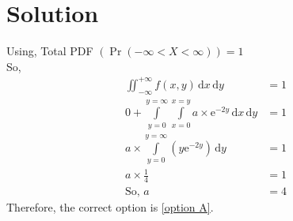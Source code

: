\documentclass[journal,12pt,twocolumn]{IEEEtran}
\providecommand{\pr}[1]{\ensuremath{\Pr\left(#1\right)}}
\providecommand{\brak}[1]{\ensuremath{\left(#1\right)}}
\begin{document}
\section*{Solution}
Using, Total PDF $(\pr{-\infty < X < \infty})=1$  \\
So,
\begin{align}
\iint_{-\infty}^{+\infty}  f(x,y) \, \mathrm{d}x \, \mathrm{d}y &= 1 \\
 0 + \int \limits_{y=0}^{y=\infty} \int \limits_{x=0}^{x=y} a \times \mathrm{e}^{-2y} \, \mathrm{d}x\, \mathrm{d}y  &= 1 \\
  a \times \int \limits_{y=0}^{y=\infty}  \brak{y\mathrm{e}^{-2y} } \, \mathrm{d}y &= 1 \\
a \times \frac{1}{4} &= 1 \\
\text{So,  } a &= 4
\end{align}
 Therefore, the correct option is \ref{option A}.  

\end{document}
